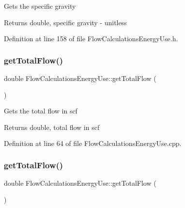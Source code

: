 Gets the specific gravity

\begin{DoxyReturn}{Returns}
double, specific gravity -\/ unitless 
\end{DoxyReturn}


Definition at line 158 of file Flow\+Calculations\+Energy\+Use.\+h.

\mbox{\label{class_flow_calculations_energy_use_a154ce8f8307b443366b99719987dd725}} 
\subsubsection{\texorpdfstring{get\+Total\+Flow()}{getTotalFlow()}\hspace{0.1cm}{\footnotesize\ttfamily [1/3]}}
{\footnotesize\ttfamily double Flow\+Calculations\+Energy\+Use\+::get\+Total\+Flow (\begin{DoxyParamCaption}{ }\end{DoxyParamCaption})}

Gets the total flow in scf

\begin{DoxyReturn}{Returns}
double, total flow in scf 
\end{DoxyReturn}


Definition at line 64 of file Flow\+Calculations\+Energy\+Use.\+cpp.

\mbox{\label{class_flow_calculations_energy_use_a154ce8f8307b443366b99719987dd725}} 
\subsubsection{\texorpdfstring{get\+Total\+Flow()}{getTotalFlow()}\hspace{0.1cm}{\footnotesize\ttfamily [2/3]}}
{\footnotesize\ttfamily double Flow\+Calculations\+Energy\+Use\+::get\+Total\+Flow (\begin{DoxyParamCaption}{ }\end{DoxyParamCaption})}

